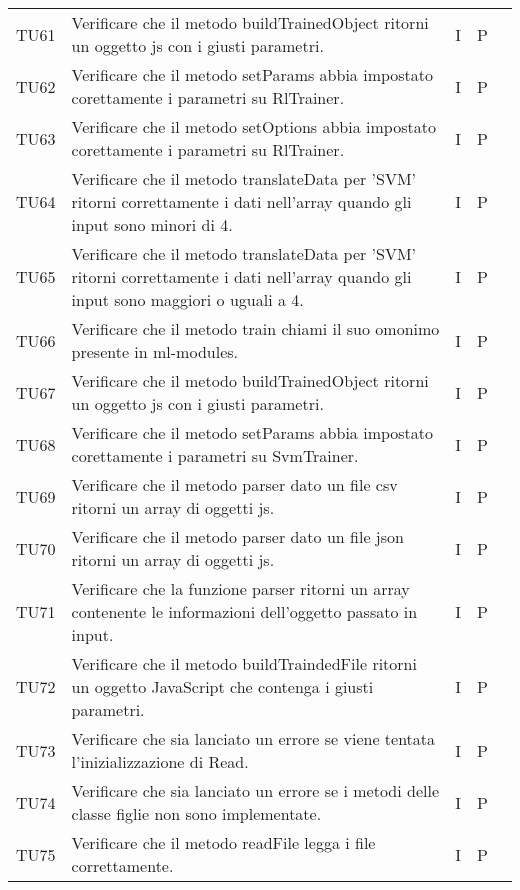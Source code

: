 \begin{longtable} {
		>{}p{15mm} 
		>{}p{79.5mm}
		>{}p{15mm} 
		>{}p{15mm}
		>{}p{0mm}}
	TU61		& Verificare che il metodo buildTrainedObject ritorni un oggetto js con i giusti parametri. & I & P &\TBstrut \\ [2mm]
	TU62		& Verificare che il metodo setParams abbia impostato corettamente i parametri su RlTrainer. & I & P &\TBstrut \\ [2mm]
	TU63		& Verificare che il metodo setOptions abbia impostato corettamente i parametri su RlTrainer. & I & P &\TBstrut \\ [2mm]
	TU64		& Verificare che il metodo translateData per 'SVM\glo' ritorni correttamente i dati nell'array quando gli input sono minori di 4.& I & P &\TBstrut \\ [2mm]
	TU65		& Verificare che il metodo translateData per 'SVM\glo' ritorni correttamente i dati nell'array quando gli input sono maggiori o uguali a 4.& I & P &\TBstrut \\ [2mm]
	TU66		& Verificare che il metodo train chiami il suo omonimo presente in ml-modules.& I & P &\TBstrut \\ [2mm]
	TU67		& Verificare che il metodo buildTrainedObject ritorni un oggetto js con i giusti parametri.& I & P &\TBstrut \\ [2mm]
	TU68		& Verificare che il metodo setParams abbia impostato corettamente i parametri su SvmTrainer.& I & P &\TBstrut \\ [2mm]
	TU69		& Verificare che il metodo parser dato un file csv ritorni un array di oggetti js.& I & P &\TBstrut \\ [2mm]
	TU70		& Verificare che il metodo parser dato un file json ritorni un array di oggetti js.& I & P &\TBstrut \\ [2mm]
	TU71		& Verificare che la funzione parser ritorni un array contenente le informazioni dell'oggetto passato in input.& I & P &\TBstrut \\ [2mm]
	TU72		& Verificare che il metodo buildTraindedFile ritorni un oggetto JavaScript che contenga i giusti parametri.& I & P &\TBstrut \\ [2mm]
	TU73		& Verificare che sia lanciato un errore se viene tentata l'inizializzazione di Read.& I & P &\TBstrut \\ [2mm]
	TU74		& Verificare che sia lanciato un errore se i metodi delle classe figlie non sono implementate.& I & P &\TBstrut \\ [2mm]
	TU75		& Verificare che il metodo readFile legga i file correttamente.& I & P &\TBstrut \\ [2mm]

\end{longtable}

